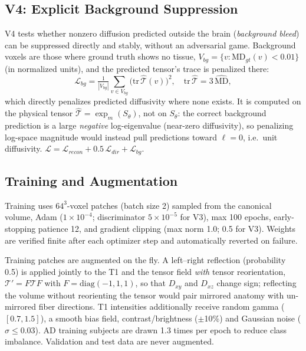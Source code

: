\documentclass[conference,compsoc]{IEEEtran}
\begin{document}
\subsection{V4: Explicit Background Suppression}
V4 tests whether nonzero diffusion predicted outside the brain (\emph{background bleed}) can be suppressed directly and stably, without an adversarial game. Background voxels are those where ground truth shows no tissue, $V_{bg}=\{v:\text{MD}_{gt}(v)<0.01\}$ (in normalized units), and the predicted tensor's trace is penalized there:
\begin{equation}
\mathcal{L}_{bg}=\tfrac{1}{|V_{bg}|}\textstyle\sum_{v\in V_{bg}}\big(\mathrm{tr}\,\hat{\mathcal{T}}(v)\big)^2,\quad \mathrm{tr}\,\hat{\mathcal{T}}=3\,\widehat{\text{MD}},
\end{equation}
which directly penalizes predicted diffusivity where none exists. It is computed on the physical tensor $\hat{\mathcal{T}}=\exp_m(S_\theta)$, not on $S_\theta$: the correct background prediction is a large \emph{negative} log-eigenvalue (near-zero diffusivity), so penalizing log-space magnitude would instead pull predictions toward $\ell=0$, i.e.\ unit diffusivity. $\mathcal{L}=\mathcal{L}_{recon}+0.5\,\mathcal{L}_{dir}+\mathcal{L}_{bg}$.

\subsection{Training and Augmentation}
Training uses $64^3$-voxel patches (batch size 2) sampled from the canonical volume, Adam ($1\times10^{-4}$; discriminator $5\times10^{-5}$ for V3), max 100 epochs, early-stopping patience 12, and gradient clipping (max norm 1.0; 0.5 for V3). Weights are verified finite after each optimizer step and automatically reverted on failure.

Training patches are augmented on the fly. A left--right reflection (probability 0.5) is applied jointly to the T1 and the tensor field \emph{with} tensor reorientation, $\mathcal{T}'=F\mathcal{T}F$ with $F=\mathrm{diag}(-1,1,1)$, so that $D_{xy}$ and $D_{xz}$ change sign; reflecting the volume without reorienting the tensor would pair mirrored anatomy with un-mirrored fiber directions. T1 intensities additionally receive random gamma ($[0.7,1.5]$), a smooth bias field, contrast/brightness ($\pm$10\%) and Gaussian noise ($\sigma\le0.03$). AD training subjects are drawn 1.3 times per epoch to reduce class imbalance. Validation and test data are never augmented.
\end{document}
